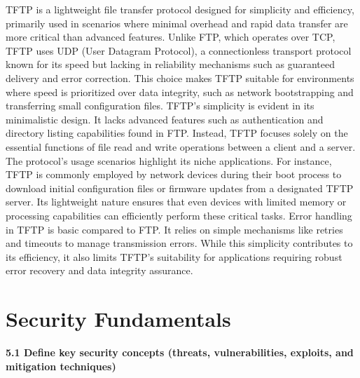 \documentclass{article}
\begin{document}
	TFTP is a lightweight file transfer protocol designed for simplicity and efficiency, primarily used in scenarios where minimal overhead and rapid data transfer are more critical than advanced features. Unlike FTP, which operates over TCP, TFTP uses UDP (User Datagram Protocol), a connectionless transport protocol known for its speed but lacking in reliability mechanisms such as guaranteed delivery and error correction. This choice makes TFTP suitable for environments where speed is prioritized over data integrity, such as network bootstrapping and transferring small configuration files. TFTP's simplicity is evident in its minimalistic design. It lacks advanced features such as authentication and directory listing capabilities found in FTP. Instead, TFTP focuses solely on the essential functions of file read and write operations between a client and a server. The protocol's usage scenarios highlight its niche applications. For instance, TFTP is commonly employed by network devices during their boot process to download initial configuration files or firmware updates from a designated TFTP server. Its lightweight nature ensures that even devices with limited memory or processing capabilities can efficiently perform these critical tasks. Error handling in TFTP is basic compared to FTP. It relies on simple mechanisms like retries and timeouts to manage transmission errors. While this simplicity contributes to its efficiency, it also limits TFTP's suitability for applications requiring robust error recovery and data integrity assurance.\\

\section{Security Fundamentals}
\noindent\textbf{5.1 Define key security concepts (threats, vulnerabilities, exploits, and mitigation techniques)}\\
\end{document}
